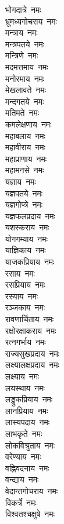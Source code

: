 \begin{multicols}{2}
\begin{flushleft}
भोगदात्रे~नमः\\
भ्रूमध्यगोचराय~नमः\\
मन्त्राय~नमः\\
मन्त्रपतये~नमः\\
मन्त्रिणे~नमः\\
मदमत्तमाय~नमः\\
मनोरमाय~नमः\\
मेखलावते~नमः\hfill{}\\
मन्दगतये~नमः\\
मतिमते~नमः\\
कमलेक्षणाय~नमः\\
महाबलाय~नमः\\
महावीराय~नमः\\
महाप्राणाय~नमः\\
महामनसे~नमः\\
यज्ञाय~नमः\\
यज्ञपतये~नमः\\
यज्ञगोप्त्रे~नमः\hfill{}\\
यज्ञफलप्रदाय~नमः\\
यशस्कराय~नमः\\
योगगम्याय~नमः\\
याज्ञिकाय~नमः\\
याजकप्रियाय~नमः\\
रसाय~नमः\\
रसप्रियाय~नमः\\
रस्याय~नमः\\
रञ्जकाय~नमः\\
रावणार्चिताय~नमः\hfill{}\\
रक्षोरक्षाकराय~नमः\\
रत्नगर्भाय~नमः\\
राज्यसुखप्रदाय~नमः\\
लक्ष्यालक्षप्रदाय~नमः\\
लक्ष्याय~नमः\\
लयस्थाय~नमः\\
लड्डुकप्रियाय~नमः\\
लानप्रियाय~नमः\\
लास्यपदाय~नमः\\
लाभकृते~नमः\hfill{}\\
लोकविश्रुताय~नमः\\
वरेण्याय~नमः\\
वह्निवदनाय~नमः\\
वन्द्याय~नमः\\
वेदान्तगोचराय~नमः\\
विकर्त्रे~नमः\\
विश्वतश्चक्षुषे~नमः\\

\end{flushleft}
\end{multicols}

